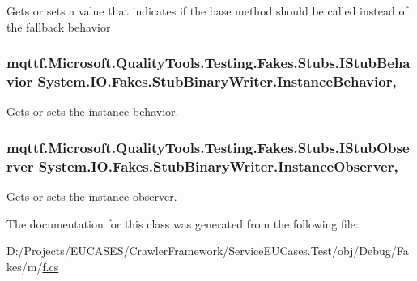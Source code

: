 Gets or sets a value that indicates if the base method should be called instead of the fallback behavior

\hypertarget{class_system_1_1_i_o_1_1_fakes_1_1_stub_binary_writer_afe2016419ac7478a7559fac00426b2dc}{
\subsubsection[{Instance\-Behavior}]{\setlength{\rightskip}{0pt plus 5cm}mqttf.\-Microsoft.\-Quality\-Tools.\-Testing.\-Fakes.\-Stubs.\-I\-Stub\-Behavior System.\-I\-O.\-Fakes.\-Stub\-Binary\-Writer.\-Instance\-Behavior\hspace{0.3cm}{\ttfamily [get]}, {\ttfamily [set]}}}\label{class_system_1_1_i_o_1_1_fakes_1_1_stub_binary_writer_afe2016419ac7478a7559fac00426b2dc}


Gets or sets the instance behavior.

\hypertarget{class_system_1_1_i_o_1_1_fakes_1_1_stub_binary_writer_a14b7748acc169c8ca017374ce52e98ff}{
\subsubsection[{Instance\-Observer}]{\setlength{\rightskip}{0pt plus 5cm}mqttf.\-Microsoft.\-Quality\-Tools.\-Testing.\-Fakes.\-Stubs.\-I\-Stub\-Observer System.\-I\-O.\-Fakes.\-Stub\-Binary\-Writer.\-Instance\-Observer\hspace{0.3cm}{\ttfamily [get]}, {\ttfamily [set]}}}\label{class_system_1_1_i_o_1_1_fakes_1_1_stub_binary_writer_a14b7748acc169c8ca017374ce52e98ff}


Gets or sets the instance observer.



The documentation for this class was generated from the following file\-:\begin{DoxyCompactItemize}
\item 
D\-:/\-Projects/\-E\-U\-C\-A\-S\-E\-S/\-Crawler\-Framework/\-Service\-E\-U\-Cases.\-Test/obj/\-Debug/\-Fakes/m/\hyperlink{m_2f_8cs}{f.\-cs}\end{DoxyCompactItemize}
